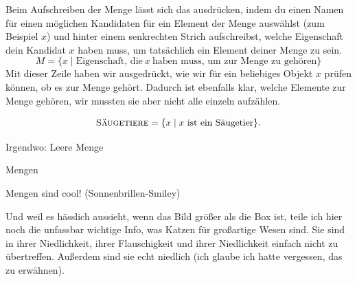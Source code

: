 \documentclass[../../main.tex]{subfiles}
\begin{document}
Beim Aufschreiben der Menge lässt sich das ausdrücken, indem du einen Namen für einen möglichen Kandidaten für ein Element der Menge auswählst (zum Beispiel $x$) und hinter einem senkrechten Strich aufschreibst, welche Eigenschaft dein Kandidat $x$ haben muss, um tatsächlich ein Element deiner Menge zu sein.
\[M=\{x\mid \text{Eigenschaft,~die}~x~\text{haben~muss,~um~zur~Menge~zu~gehören}\}\]
Mit dieser Zeile haben wir ausgedrückt, wie wir für ein beliebiges Objekt $x$ prüfen können, ob es zur Menge gehört. Dadurch ist ebenfalls klar, welche Elemente zur Menge gehören, wir mussten sie aber nicht alle einzeln aufzählen.

\begin{example}{}
    \[\textsc{Säugetiere}=\{x\mid x~\text{ist~ein~Säugetier}\}.\]
\end{example}

Irgendwo: Leere Menge

\begin{nutshell}{Mengen}

    Mengen sind cool! (Sonnenbrillen-Smiley)

    Und weil es hässlich aussieht, wenn das Bild größer als die Box ist, teile ich hier noch die unfassbar wichtige Info, was Katzen für großartige Wesen sind. Sie sind in ihrer Niedlichkeit, ihrer Flauschigkeit und ihrer Niedlichkeit einfach nicht zu übertreffen. Außerdem sind sie echt niedlich (ich glaube ich hatte vergessen, das zu erwähnen). 
\end{nutshell}
\end{document}
